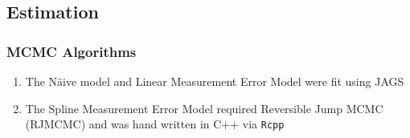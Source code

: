 \documentclass[handout]{beamer}\usepackage[]{graphicx}\usepackage[]{color}
\begin{document}
\subsection{Estimation}


\begin{frame}
\frametitle{MCMC Algorithms}

\begin{enumerate}
\item
The N{\"a}ive model and Linear Measurement Error Model were fit using JAGS
\item
The Spline Measurement Error Model required Reversible Jump MCMC (RJMCMC) and was hand written in C++ via \texttt{Rcpp}
\end{enumerate}


\end{frame}
\end{document}
